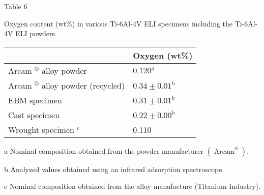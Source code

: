 \documentclass[10pt]{article}
\begin{document}
Table 6

Oxygen content (wt\%) in various Ti-6Al-4V ELI specimens including the Ti-6Al-4V ELI powders.

\begin{center}
\begin{tabular}{ll}
\hline
 & Oxygen (wt\%) \\
\hline
Arcam $^{\circledR}$ alloy powder & $0.120^{\mathrm{a}}$ \\
Arcam $^{\circledR}$ alloy powder (recycled) & $0.34 \pm 0.01^{\mathrm{b}}$ \\
EBM specimen & $0.31 \pm 0.01^{\mathrm{b}}$ \\
Cast specimen & $0.22 \pm 0.00^{\mathrm{b}}$ \\
Wrought specimen $^{\mathrm{c}}$ & 0.110 \\
\hline
\end{tabular}
\end{center}

a Nominal composition obtained from the powder manufacturer $\left(\operatorname{Arcam}^{\circledR}\right)$.

b Analyzed values obtained using an infrared adsorption spectroscope.

c Nominal composition obtained from the alloy manufacture (Titanium Industry).
\end{document}
